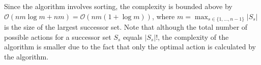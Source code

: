 \documentclass[dissertation,draft*]{aaltoseries}
\begin{document}
Since the algorithm involves sorting, the complexity is bounded above by $\mathcal{O}(n m \log m + nm) = \mathcal{O}(n m (1+\log m))$,
where $m = \max_{s \in \{1,\ldots,n-1\}}|S_s|$ is the size of the largest successor set. Note that although the total number of 
possible actions for a successor set $S_s$ equals $|S_s|!$, the complexity of the algorithm is smaller due to the fact that 
only the optimal action is calculated by the algorithm. 

% 
% 




\end{document}
